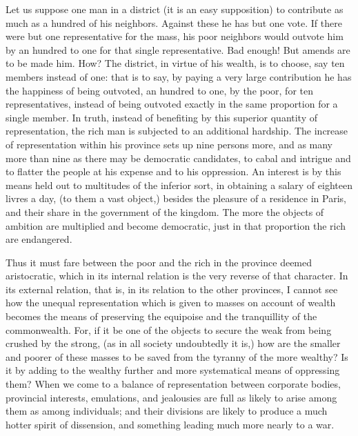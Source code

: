 Let us suppose one man in a district (it is an easy supposition) to contribute as much as a hundred of his neighbors. Against these he has but one vote. If there were but one representative for the mass, his poor neighbors would outvote him by an hundred to one for that single representative. Bad enough! But amends are to be made him. How? The district, in virtue of his wealth, is to choose, say ten members instead of one: that is to say, by paying a very large contribution he has the happiness of being outvoted, an hundred to one, by the poor, for ten representatives, instead of being outvoted exactly in the same proportion for a single member. In truth, instead of benefiting by this superior quantity of representation, the rich man is subjected to an additional hardship. The increase of representation within his province sets up nine persons more, and as many more than nine as there may be democratic candidates, to cabal and intrigue and to flatter the people at his expense and to his oppression. An interest is by this means held out to multitudes of the inferior sort, in obtaining a salary of eighteen livres a day, (to them a vast object,) besides the pleasure of a residence in Paris, and their share in the government of the kingdom. The more the objects of ambition are multiplied and become democratic, just in that proportion the rich are endangered.

Thus it must fare between the poor and the rich in the province deemed aristocratic, which in its internal relation is the very reverse of that character. In its external relation, that is, in its relation to the other provinces, I cannot see how the unequal representation which is given to masses on account of wealth becomes the means of preserving the equipoise and the tranquillity of the commonwealth. For, if it be one of the objects to secure the weak from being crushed by the strong, (as in all society undoubtedly it is,) how are the smaller and poorer of these masses to be saved from the tyranny of the more wealthy? Is it by adding to the wealthy further and more systematical means of oppressing them? When we come to a balance of representation between corporate bodies, provincial interests, emulations, and jealousies are full as likely to arise among them as among individuals; and their divisions are likely to produce a much hotter spirit of dissension, and something leading much more nearly to a war.


